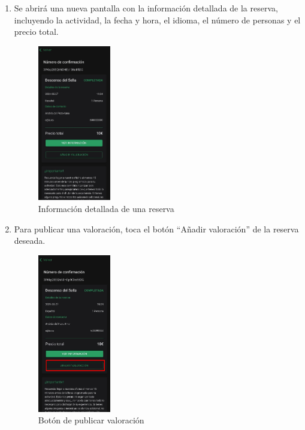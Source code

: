 \begin{enumerate}
\begin{figure}[H]
	      \end{figure}
	\item Se abrirá una nueva pantalla con la información detallada de la reserva, incluyendo la actividad, la fecha y hora, el idioma, el número de personas y el precio total.
	      \begin{figure}[H]
		      \centering
		      \includegraphics[width=0.3\textwidth]{7-Construccion/Manuales/app/P1-Publicar.png}
		      \caption{Información detallada de una reserva}
	      \end{figure}
	\item Para publicar una valoración, toca el botón “Añadir valoración” de la reserva deseada.
	      \begin{figure}[H]
		      \centering
		      \includegraphics[width=0.3\textwidth]{7-Construccion/Manuales/app/P2-Publicar.png}
		      \caption{Botón de publicar valoración}
	      \end{figure}

\end{enumerate}
